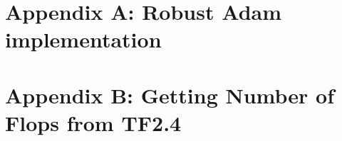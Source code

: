 \documentclass[fleqn,12pt]{olplainarticle}
\begin{document}








\appendix
\section{Appendix A: Robust Adam implementation}  \label{app:RoAdam}

\section{Appendix B: Getting Number of Flops from TF2.4}  \label{app:flops}

\end{document}
